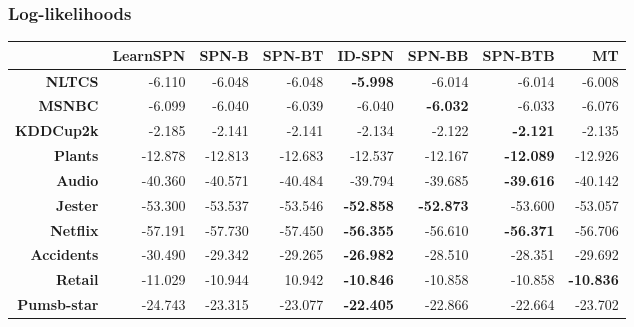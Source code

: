\documentclass[xcolor={usenames,dvipsnames,svgnames}, compress]{beamer}
\begin{document}
\begin{frame}
  \frametitle{Log-likelihoods}
  \tiny
  \begin{table}[!htbp]
    \centering
     \setlength{\tabcolsep}{3pt}  
    \begin{tabular}{r r r r r r r r}
      \toprule
      & \textsf{LearnSPN} & \textsf{SPN-B} & \textsf{SPN-BT} & \textsf{ID-SPN}  & \textsf{SPN-BB}   & \textsf{SPN-BTB}  & \textsf{MT}      \\
      \midrule                                                                                     
      \textbf{NLTCS}      & -6.110            & -6.048         & -6.048          & \textbf{-5.998}  & -6.014            & -6.014            & -6.008           \\
      \textbf{MSNBC}      & -6.099            & -6.040         & -6.039          & -6.040           & \textbf{-6.032}   & -6.033            & -6.076           \\
      \textbf{KDDCup2k}   & -2.185            & -2.141         & -2.141          & -2.134           & -2.122            & \textbf{-2.121}   & -2.135           \\
      \textbf{Plants}     & -12.878           & -12.813        & -12.683         & -12.537          & -12.167           & \textbf{-12.089}  & -12.926          \\
      \textbf{Audio}      & -40.360           & -40.571        & -40.484         & -39.794          & -39.685           & \textbf{-39.616}  & -40.142          \\
      \textbf{Jester}     & -53.300           & -53.537        & -53.546         & \textbf{-52.858} & \textbf{-52.873}  & -53.600           & -53.057          \\
      \textbf{Netflix}    & -57.191           & -57.730        & -57.450         & \textbf{-56.355} & -56.610           & \textbf{-56.371}  & -56.706          \\
      \textbf{Accidents}  & -30.490           & -29.342        & -29.265         & \textbf{-26.982} & -28.510           & -28.351           & -29.692          \\
      \textbf{Retail}     & -11.029           & -10.944        & 10.942          & \textbf{-10.846} & -10.858           & -10.858           & \textbf{-10.836} \\
      \textbf{Pumsb-star} & -24.743           & -23.315        & -23.077         & \textbf{-22.405} & -22.866           & -22.664           & -23.702          \\

\end{tabular}
\end{table}
\end{frame}
\end{document}
